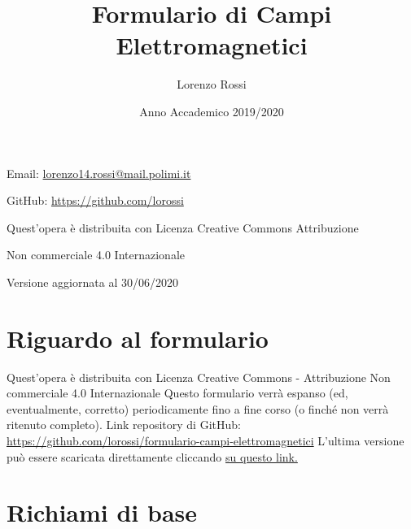 \documentclass{article}
\title{\Huge Formulario di Campi Elettromagnetici}
\author{\LARGE Lorenzo Rossi}
\date{\LARGE Anno Accademico 2019/2020}
\begin{document}
\maketitle

\vspace{18em}

\large
\begin{doublespacing}\hypersetup{
	urlcolor=black,
}
\centerline{Email: \href{mailto://lorenzo14.rossi@mail.polimi.it}{lorenzo14.rossi@mail.polimi.it}}
\centerline{GitHub: \url{https://github.com/lorossi}}

\vspace{18em}
\centerline{Quest'opera è distribuita con Licenza Creative Commons Attribuzione}
\centerline{Non commerciale 4.0 Internazionale \ccbynceu}
\centerline{Versione aggiornata al 30/06/2020}
\end{doublespacing}
\newpage


\tableofcontents
\clearpage
{}
\newpage

\section{Riguardo al formulario}
Quest'opera è distribuita con Licenza Creative Commons - Attribuzione Non commerciale 4.0 Internazionale \ccbynceu \newline
Questo formulario verrà espanso (ed, eventualmente, corretto) periodicamente fino a fine corso (o finché non verrà ritenuto completo). \newline
Link repository di GitHub: \url{https://github.com/lorossi/formulario-campi-elettromagnetici} \newline
L'ultima versione può essere scaricata direttamente cliccando \href{https://github.com/lorossi/formulario-campi-elettromagnetici/raw/master/formulario_campi.pdf}{su questo link.}

\section{Richiami di base}
\end{document}
